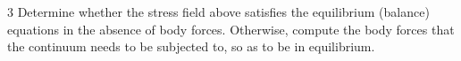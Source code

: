 
  \begin{problem}{3}
    Determine whether the stress field above satisfies the equilibrium (balance) equations in the absence of body forces.
    Otherwise, compute the body forces that the continuum needs to be subjected to, so as to be in equilibrium.
  \end{problem}

